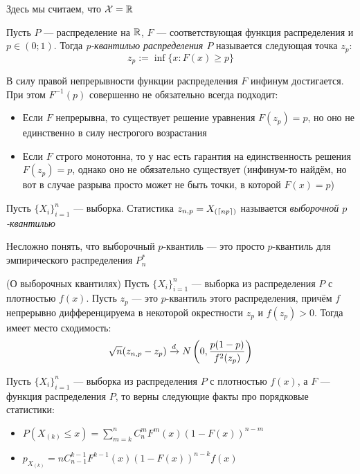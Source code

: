 \begin{note}
	Здесь мы считаем, что $\mathcal{X} = \mathbb{R}$
\end{note}

\begin{definition}
	Пусть $P$ --- распределение на $\mathbb{R}$, $F$ --- соответствующая функция распределения и $p \in (0; 1)$. Тогда \textit{p-квантилью распределения $P$} называется следующая точка $z_p$:
	\[
		z_p := \inf \{x \colon F(x) \ge p\}
	\]
\end{definition}

\begin{note}
	В силу правой непрерывности функции распределения $F$ инфинум достигается. При этом $F^{-1}(p)$ совершенно не обязательно всегда подходит:
	\begin{itemize}
		\item Если $F$ непрерывна, то существует решение уравнения $F(z_p) = p$, но оно не единственно в силу нестрогого возрастания
		
		\item Если $F$ строго монотонна, то у нас есть гарантия на единственность решения $F(z_p) = p$, однако оно не обязательно существует (инфинум-то найдём, но вот в случае разрыва просто может не быть точки, в которой $F(x) = p$)
	\end{itemize}
\end{note}

\begin{definition}
	Пусть $\{X_i\}_{i = 1}^n$ --- выборка. Статистика $z_{n, p} = X_{(\left\lceil np\right\rceil)}$ называется \textit{выборочной $p$-квантилью}
\end{definition}

\begin{note}
	Несложно понять, что выборочный $p$-квантиль --- это просто $p$-квантиль для эмпирического распределения $P_n^*$
\end{note}

\begin{theorem} (О выборочных квантилях)
	Пусть $\{X_i\}_{i = 1}^n$ --- выборка из распределения $P$ с плотностью $f(x)$. Пусть $z_p$ --- это $p$-квантиль этого распределения, причём $f$ непрерывно дифференцируема в некоторой окрестности $z_p$ и $f(z_p) > 0$. Тогда имеет место сходимость:
	\[
		\sqrt{n}(z_{n, p} - z_p) \xrightarrow{d} N\left(0, \frac{p(1 - p)}{f^2(z_p)}\right)
	\]
\end{theorem}

\begin{reminder}
	Пусть $\{X_i\}_{i = 1}^n$ --- выборка из распределения $P$ с плотностью $f(x)$, а $F$ --- функция распределения $P$, то верны следующие факты про порядковые статистики:
	\begin{itemize}
		\item $P(X_{(k)} \le x) = \sum_{m = k}^n C_n^m F^m(x)(1 - F(x))^{n - m}$
		
		\item $p_{X_{(k)}} = n C_{n - 1}^{k - 1} F^{k - 1}(x)(1 - F(x))^{n - k}f(x)$
	\end{itemize}
\end{reminder}

